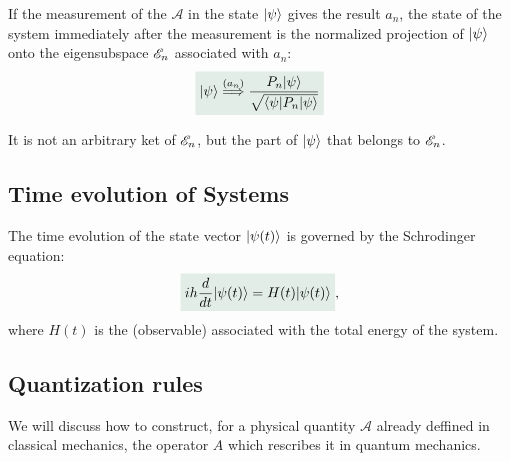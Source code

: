 \begin{definition}
    If the measurement of the $\mathcal{A}$ in the state $|\psi\rangle$ gives the result $a_n$, the state of the system immediately after the measurement is the normalized 
    projection of $|\psi\rangle$ onto the eigensubspace $\mathscr{E}_n$ associated with $a_n$:
    \begin{align}
        \highlight{\ket{\psi}\stackrel{(a_n)}{\Longrightarrow}\frac{P_n\ket{\psi}}{\sqrt{\braket{\psi|P_n|\psi}}}}
    \end{align}
\end{definition}
It is not an arbitrary ket of $\mathscr{E}_n$, but the part of $|\psi\rangle$ that belongs to $\mathscr{E}_n$. 

\subsection{Time evolution of Systems}

\begin{definition}
    The time evolution of the state vector $|\psi(t)\rangle$ is governed by the Schrodinger equation:
    \begin{align}
        \highlight{ih\frac{d}{dt}\ket{\psi(t)}=H(t)\ket{\psi(t)}},
    \end{align}
    where $H(t)$ is the  (observable) associated with the total energy of the system.
\end{definition}


\subsection{Quantization rules}
We will discuss how to construct, for a physical quantity $\mathcal{A}$ already deffined in classical mechanics, the operator $A$ which rescribes it in quantum mechanics.




